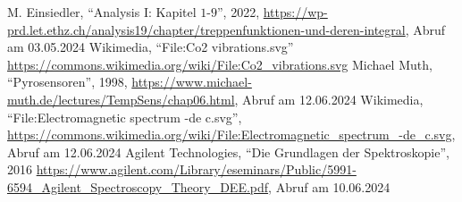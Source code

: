 \documentclass[12pt,a4paper]{scrartcl}
\numberwithin{equation}{section} %
\begin{document}
\begin{thebibliography}{9}
	M. Einsiedler, ``Analysis I: Kapitel $1$-$9$'', 2022,
	\url{https://wp-prd.let.ethz.ch/analysis19/chapter/treppenfunktionen-und-deren-integral},
	Abruf am 03.05.2024
	Wikimedia, ``File:Co2 vibrations.svg''
	\url{https://commons.wikimedia.org/wiki/File:Co2_vibrations.svg}
	Michael Muth, ``Pyrosensoren'', 1998,
	\url{https://www.michael-muth.de/lectures/TempSens/chap06.html}, Abruf am 12.06.2024
	Wikimedia, ``File:Electromagnetic spectrum -de c.svg'',
	\url{https://commons.wikimedia.org/wiki/File:Electromagnetic_spectrum_-de_c.svg}, Abruf am 12.06.2024
	Agilent Technologies, ``Die Grundlagen der Spektroskopie'', 2016
	\url{https://www.agilent.com/Library/eseminars/Public/5991-6594_Agilent_Spectroscopy_Theory_DEE.pdf},
	Abruf am 10.06.2024
\end{thebibliography}
\end{document}
